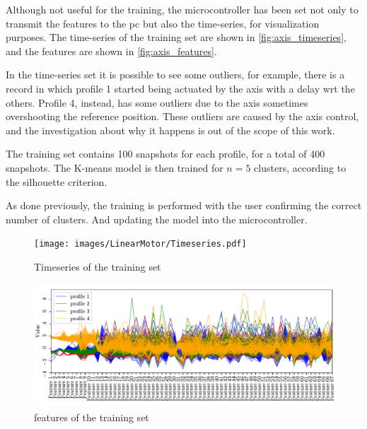 Although not useful for the training, the microcontroller has been set not only to transmit the features to the \gls{pc} but also the time-series, for visualization purposes. The time-series of the training set are shown in \autoref{fig:axis_timeseries}, and the features are shown in \autoref{fig:axis_features}.

In the time-series set it is possible to see some outliers, for example, there is a record in which profile 1 started being actuated by the axis with a delay \gls{wrt} the others. Profile 4, instead, has some outliers due to the axis sometimes overshooting the reference position. These outliers are caused by the axis control, and the investigation about why it happens is out of the scope of this work. 

The training set contains 100 snapshots for each profile, for a total of 400 snapshots. The K-means model is then trained for $n=5$ clusters, according to the silhouette criterion.

As done previously, the training is performed with the user confirming the correct number of clusters. And updating the model into the microcontroller.

\begin{figure}
    \centering
    \texttt{[image: images/LinearMotor/Timeseries.pdf]}
    \caption{Timeseries of the training set}
    \label{fig:axis_timeseries}
\end{figure}


\begin{figure}
    \centering
    \includegraphics[width=\textwidth]{images/LinearMotor/Features.pdf}
    \caption{features of the training set}
    \label{fig:axis_features}
\end{figure}

